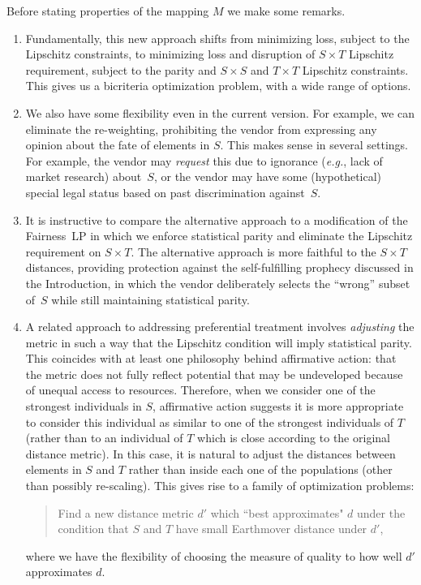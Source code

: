 \documentclass[letterpaper,11pt]{article}
\theoremstyle{definition}
\newcommand{\vendor}{vendor}
\begin{document}
Before stating properties of the mapping $M$ we make some
remarks.

\begin{enumerate}
\item
Fundamentally, this new approach shifts from
minimizing loss, subject to the Lipschitz constraints,
to minimizing loss and disruption of $S \times T$ Lipschitz requirement,
subject to the parity and $S \times S$ and $T \times T$ Lipschitz constraints.
This gives us a bicriteria optimization problem, with a wide range of
options.

\item
We also have some flexibility even in the current version.  For
example, we can eliminate the re-weighting, prohibiting the \vendor{}
from expressing any opinion about the fate of elements in $S$.  This
makes sense in several settings.  For example, the \vendor{} may {\em
  request} this due to ignorance ({\it e.g.}, lack of market research)
about~$S$, or the \vendor{} may have some (hypothetical) special legal
status based on past discrimination against~$S$.

\item
It is instructive to compare the alternative approach
to a modification of the Fairness~LP in which
we enforce statistical parity and eliminate the Lipschitz
requirement on $S \times T$.
The alternative approach is more faithful to the $S \times T$ distances,
providing protection against the self-fulfilling
prophecy discussed in the Introduction, in which the  \vendor{}
deliberately selects the ``wrong'' subset of~$S$ while still
maintaining statistical parity.

\item
A related approach to addressing preferential treatment involves {\em
  adjusting} the metric in such a way that the Lipschitz condition
will imply statistical parity.  This coincides with at least one philosophy
behind affirmative action: that the metric does not fully reflect
potential that may be undeveloped
because of unequal access to resources.  Therefore, when we consider
one of the strongest individuals in $S$, affirmative action suggests
it is more appropriate to consider this individual as similar to one
of the strongest individuals of $T$ (rather than to an individual of
$T$ which is close according to the original distance metric).  In
this case, it is natural to adjust the distances between elements in
$S$ and $T$ rather than inside each one of the populations (other than
possibly re-scaling). This gives rise to a family of optimization
problems:
\begin{quote}
Find a new distance metric $d'$ which ``best approximates" $d$ under
the condition that $S$ and $T$ have small Earthmover distance under
$d'$,
\end{quote}
where we have the flexibility of choosing the measure
of quality to how well $d'$ approximates $d$.
\end{enumerate}
\end{document}
